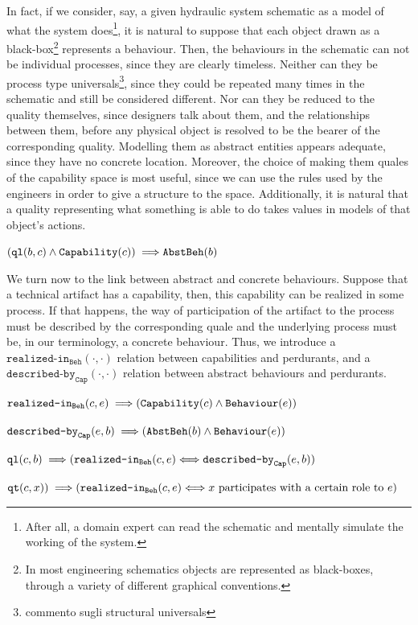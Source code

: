 \documentclass[crcready]{iosart2x}
\newcommand{\bflist}{\begin{list}{}{\setlength{\topsep}{2mm}\setlength{\partopsep}{0mm}\setlength{\parsep}{0mm}\setlength{\leftmargin}{9mm}\setlength{\labelwidth}{8mm}}}
\newcommand{\eflist}{\end{list}}
\newcommand{\AxLabel}{\textrm{a}}
\newcommand{\DefLabel}{\textrm{d}}
\newcounter{cntax}
\newcommand{\myax}[1]{\refstepcounter{cntax}\begin{small}{\bf \AxLabel\thecntax\label{ax:#1}}\end{small}}
\newcounter{cntdef}
\newcommand{\mydf}[1]{\refstepcounter{cntdef}\begin{small}{\bf \DefLabel\thecntdef\label{def:#1}}\end{small}}
\newcommand{\generalStyle}[1]{\texttt{#1}}
\newcommand{\biRel}[3]{\generalStyle{#1}(#2,#3)}
\newcommand{\uniRel}[2]{\generalStyle{#1}(#2)}
\newcommand{\biRelPar}[4]{\generalStyle{#1}_{\generalStyle{#4}}(#2,#3)}
\newcommand{\myiff}{\Longleftrightarrow}
\newcommand{\myfi}{\hspace{0.9mm} \Longrightarrow}
\newcommand{\DOLCEQualityDirect}[2]{\biRel{qt}{#1}{#2}}
\newcommand{\DOLCEQualeDirect}[2]{\biRel{{ql}}{#1}{#2}}
\newcommand{\Capability}[1]{\uniRel{Capability}{#1}}
\newcommand{\BehaviourAbstract}[1]{\uniRel{AbstBeh}{#1}}
\newcommand{\BehaviourConcrete}[1]{\uniRel{Behaviour}{#1}}
\newcommand{\describedBy}[2]{\biRelPar{described-by}{#1}{#2}{Cap}}
\newcommand{\realizedIn}[2]{\biRelPar{realized-in}{#1}{#2}{Beh}}
\newcommand{\TODO}[1]{{\color{red} #1}}
\begin{document}
In fact, if we consider, say, a given hydraulic system schematic as a model of what the system does\footnote{After all, a domain expert can read the schematic and mentally simulate the working of the system.}, 
it is natural to suppose that each object drawn as a black-box\footnote{In most engineering schematics objects are represented as black-boxes, through a variety of different graphical conventions.} represents a behaviour. 
Then, the behaviours in the schematic can not be individual processes, 
since they are clearly timeless. 
Neither can they be process type universals\footnote{\TODO{commento sugli structural universals}}, 
since they could be repeated many times in the schematic and still be considered different. 
Nor can they be reduced to the quality themselves, since designers talk about them, and the relationships between them, before any physical object is resolved to be the bearer of the corresponding quality. 
Modelling them as abstract entities appears adequate, since they have no concrete location.
Moreover, the choice of making them quales of the capability space is most useful, since 
we can use the rules used by the engineers in order to give a structure to the space. 
Additionally, it is natural that a quality representing what something is able to do takes values in models of that object's actions.
\bflist
\item[\mydf{abstractBehavior}] $ (\DOLCEQualeDirect{b}{c} \land \Capability{c}) \\ \myfi \BehaviourAbstract{b} $ 
\eflist

We turn now to the link between abstract and concrete behaviours. Suppose that a technical artifact has a capability, then, this capability can be realized in some process. 
If that happens, the way of participation of the artifact to the process must be described by the corresponding quale and the underlying process must be, in our terminology, a concrete behaviour.
Thus, we introduce a $\realizedIn{\cdot}{\cdot}$ relation between capabilities and perdurants, and a $\describedBy{\cdot}{\cdot}$ relation between abstract behaviours and perdurants. 
\bflist
 \item[\myax{realized_in_range}] $ \realizedIn{c}{e} \myfi \\ (\Capability{c} \land \BehaviourConcrete{e}) $ 
 \item[\myax{described_by_range}] $ \describedBy{e}{b} \myfi \\ (\BehaviourAbstract{b} \land \BehaviourConcrete{e}) $  
 \item[\myax{realized_described}] $ \DOLCEQualeDirect{c}{b} \myfi (\realizedIn{c}{e} \\ \myiff \describedBy{e}{b}) $
 \TODO{\item[\myax{realized_described?}] $ \DOLCEQualityDirect{c}{x}) \myfi (\realizedIn{c}{e} \\ \myiff x\textnormal{ participates with a certain role to }e) $} 
\eflist
\end{document}
